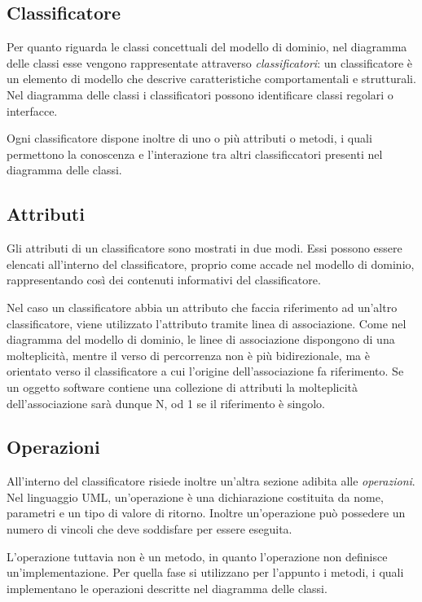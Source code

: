 \subsection{Classificatore} %
\label{sub:classificatore}

Per quanto riguarda le classi concettuali del modello di dominio, nel diagramma delle classi esse vengono rappresentate attraverso {\itshape classificatori}: un classificatore è un elemento di modello che descrive caratteristiche comportamentali e strutturali. Nel diagramma delle classi i classificatori possono identificare classi regolari o interfacce.

Ogni classificatore dispone inoltre di uno o più attributi o metodi, i quali permettono la conoscenza e l'interazione tra altri classificcatori presenti nel diagramma delle classi.

\subsection{Attributi} %
\label{sub:attributi_dcd}
Gli attributi di un classificatore sono mostrati in due modi. Essi possono essere elencati all'interno del classificatore, proprio come accade nel modello di dominio, rappresentando così dei contenuti informativi del classificatore.

Nel caso un classificatore abbia un attributo che faccia riferimento ad un'altro classificatore, viene utilizzato l'attributo tramite linea di associazione. Come nel diagramma del modello di dominio, le linee di associazione dispongono di una molteplicità, mentre il verso di percorrenza non è più bidirezionale, ma è orientato verso il classificatore a cui l'origine dell'associazione fa riferimento. Se un oggetto software contiene una collezione di attributi la molteplicità dell'associazione sarà dunque N, od 1 se il riferimento è singolo.

\subsection{Operazioni} %
\label{sub:operazioni}
All'interno del classificatore risiede inoltre un'altra sezione adibita alle {\itshape operazioni}. Nel linguaggio UML, un'operazione è una dichiarazione costituita da nome, parametri e un tipo di valore di ritorno. Inoltre un'operazione può possedere un numero di vincoli che deve soddisfare per essere eseguita.

L'operazione tuttavia non è un metodo, in quanto l'operazione non definisce un'implementazione. Per quella fase si utilizzano per l'appunto i metodi, i quali implementano le operazioni descritte nel diagramma delle classi.

